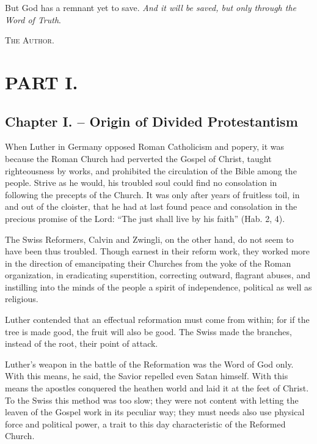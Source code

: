 \documentclass[
]{book}
\begin{document}
But God has a remnant yet to save. \emph{And it will be saved, but only through the Word of Truth}.

\textsc{The Author.}

\hypertarget{part-i.}{%
\chapter*{PART I.}\label{part-i.}}

\hypertarget{chapter-i.-origin-of-divided-protestantism}{%
\section*{Chapter I. -- Origin of Divided Protestantism}\label{chapter-i.-origin-of-divided-protestantism}}

When Luther in Germany opposed Roman Catholicism and popery, it was because the Roman Church had perverted the Gospel of Christ, taught righteousness by works, and prohibited the circulation of the Bible among the people. Strive as he would, his troubled soul could find no consolation in following the precepts of the Church. It was only after years of fruitless toil, in and out of the cloister, that he had at last found peace and consolation in the precious promise of the Lord: ``The just shall live by his faith'' (Hab. 2, 4).

The Swiss Reformers, Calvin and Zwingli, on the other hand, do not seem to have been thus troubled. Though earnest in their reform work, they worked more in the direction of emancipating their Churches from the yoke of the Roman organization, in eradicating superstition, correcting outward, flagrant abuses, and instilling into the minds of the people a spirit of independence, political as well as religious.

Luther contended that an effectual reformation must come from within; for if the tree is made good, the fruit will also be good. The Swiss made the branches, instead of the root, their point of attack.

Luther's weapon in the battle of the Reformation was the Word of God only. With this means, he said, the Savior repelled even Satan himself. With this means the apostles conquered the heathen world and laid it at the feet of Christ. To the Swiss this method was too slow; they were not content with letting the leaven of the Gospel work in its peculiar way; they must needs also use physical force and political power, a trait to this day characteristic of the Reformed Church.
\end{document}
